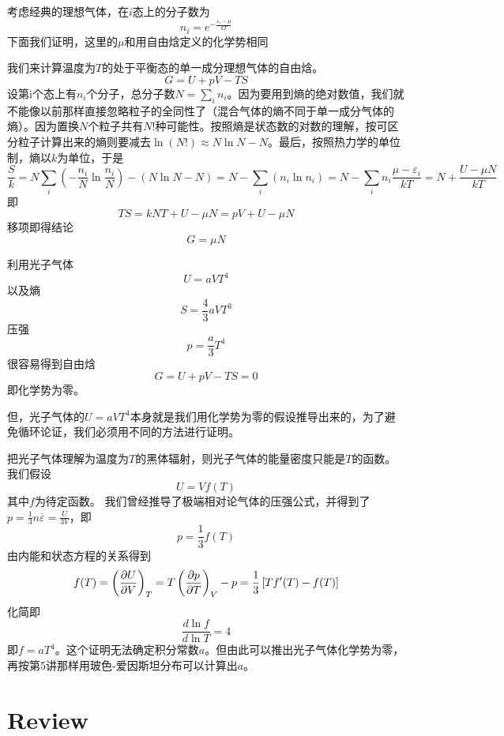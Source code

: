 \documentclass[CJK]{beamer}
\begin{document}
\begin{frame}
\bch
{\small
考虑经典的理想气体，在$i$态上的分子数为
$$ n_i = e^{-\frac{\varepsilon_i-\mu}{kT}}$$
下面我们证明，这里的$\mu$和用自由焓定义的化学势相同}

{\scriptsize
  我们来计算温度为$T$的处于平衡态的单一成分理想气体的自由焓。
  $$G = U + pV - TS$$
  设第i个态上有$n_i$个分子，总分子数$N=\sum_i n_i$。因为要用到熵的绝对数值，我们就不能像以前那样直接忽略粒子的全同性了（混合气体的熵不同于单一成分气体的熵）。因为置换$N$个粒子共有$N!$种可能性。按照熵是状态数的对数的理解，按可区分粒子计算出来的熵则要减去$\ln (N!) \approx N \ln N - N $。最后，按照热力学的单位制，熵以$k$为单位，于是
  $$\frac{S}{k} = N\sum_i\left(-\frac{n_i}{N}\ln\frac{n_i}{N}\right)  - (N\ln N - N) = N-\sum_i (n_i\ln n_i) = N - \sum_in_i\frac{\mu - \varepsilon_i}{kT} =N+\frac{U-\mu N}{kT}  $$
  即
  $$TS = kNT + U - \mu N = pV + U - \mu N$$
  移项即得结论$$ G = \mu N$$
}
\ech
\end{frame}

\begin{frame}
\bch
利用光子气体
$$U = aV T^4$$
以及熵
$$ S = \frac{4}{3}aV T^3$$
压强
$$ p = \frac{a}{3} T^4$$
很容易得到自由焓
$$ G = U + pV - TS = 0$$
即化学势为零。

但，光子气体的$U = aVT^4$本身就是我们用化学势为零的假设推导出来的，为了避免循环论证，我们必须用不同的方法进行证明。
\ech
\end{frame}


\begin{frame}
\bch
{\small
把光子气体理解为温度为$T$的黑体辐射，则光子气体的能量密度只能是$T$的函数。我们假设
$$ U = V f(T)$$
其中$f$为待定函数。
我们曾经推导了极端相对论气体的压强公式，并得到了$p = \frac{1}{3} n\overline{\varepsilon} = \frac{U}{3V} $，即
$$p = \frac{1}{3} f(T)$$
由内能和状态方程的关系得到
$$ f(T) = \left(\frac{\partial U}{\partial V}\right)_{T} = T\left(\frac{\partial p}{\partial T}\right)_{V} - p = \frac{1}{3} \left[T f'(T) - f(T)\right]$$
化简即
$$ \frac{d \ln f}{d\ln T}  = 4 $$
即$ f = a T^4 $。这个证明无法确定积分常数$a$。但由此可以推出光子气体化学势为零，再按第5讲那样用玻色-爱因斯坦分布可以计算出$a$。
}
\ech
\end{frame}

\section{Review}

\begin{frame}
\end{frame}
\end{document}

